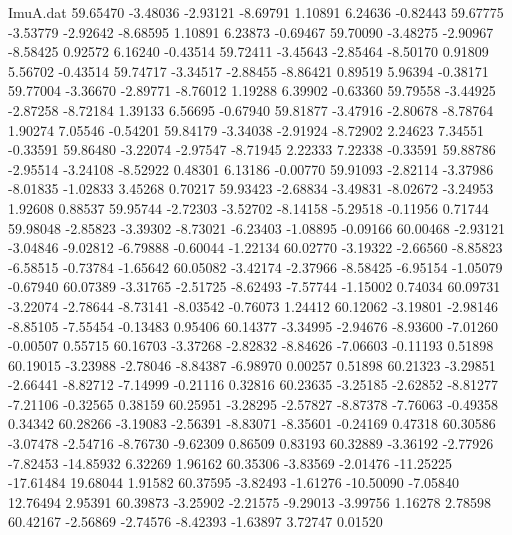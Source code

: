 \begin{filecontents}{ImuA.dat}
  59.65470   -3.48036   -2.93121   -8.69791    1.10891    6.24636   -0.82443
  59.67775   -3.53779   -2.92642   -8.68595    1.10891    6.23873   -0.69467
  59.70090   -3.48275   -2.90967   -8.58425    0.92572    6.16240   -0.43514
  59.72411   -3.45643   -2.85464   -8.50170    0.91809    5.56702   -0.43514
  59.74717   -3.34517   -2.88455   -8.86421    0.89519    5.96394   -0.38171
  59.77004   -3.36670   -2.89771   -8.76012    1.19288    6.39902   -0.63360
  59.79558   -3.44925   -2.87258   -8.72184    1.39133    6.56695   -0.67940
  59.81877   -3.47916   -2.80678   -8.78764    1.90274    7.05546   -0.54201
  59.84179   -3.34038   -2.91924   -8.72902    2.24623    7.34551   -0.33591
  59.86480   -3.22074   -2.97547   -8.71945    2.22333    7.22338   -0.33591
  59.88786   -2.95514   -3.24108   -8.52922    0.48301    6.13186   -0.00770
  59.91093   -2.82114   -3.37986   -8.01835   -1.02833    3.45268    0.70217
  59.93423   -2.68834   -3.49831   -8.02672   -3.24953    1.92608    0.88537
  59.95744   -2.72303   -3.52702   -8.14158   -5.29518   -0.11956    0.71744
  59.98048   -2.85823   -3.39302   -8.73021   -6.23403   -1.08895   -0.09166
  60.00468   -2.93121   -3.04846   -9.02812   -6.79888   -0.60044   -1.22134
  60.02770   -3.19322   -2.66560   -8.85823   -6.58515   -0.73784   -1.65642
  60.05082   -3.42174   -2.37966   -8.58425   -6.95154   -1.05079   -0.67940
  60.07389   -3.31765   -2.51725   -8.62493   -7.57744   -1.15002    0.74034
  60.09731   -3.22074   -2.78644   -8.73141   -8.03542   -0.76073    1.24412
  60.12062   -3.19801   -2.98146   -8.85105   -7.55454   -0.13483    0.95406
  60.14377   -3.34995   -2.94676   -8.93600   -7.01260   -0.00507    0.55715
  60.16703   -3.37268   -2.82832   -8.84626   -7.06603   -0.11193    0.51898
  60.19015   -3.23988   -2.78046   -8.84387   -6.98970    0.00257    0.51898
  60.21323   -3.29851   -2.66441   -8.82712   -7.14999   -0.21116    0.32816
  60.23635   -3.25185   -2.62852   -8.81277   -7.21106   -0.32565    0.38159
  60.25951   -3.28295   -2.57827   -8.87378   -7.76063   -0.49358    0.34342
  60.28266   -3.19083   -2.56391   -8.83071   -8.35601   -0.24169    0.47318
  60.30586   -3.07478   -2.54716   -8.76730   -9.62309    0.86509    0.83193
  60.32889   -3.36192   -2.77926   -7.82453  -14.85932    6.32269    1.96162
  60.35306   -3.83569   -2.01476  -11.25225  -17.61484   19.68044    1.91582
  60.37595   -3.82493   -1.61276  -10.50090   -7.05840   12.76494    2.95391
  60.39873   -3.25902   -2.21575   -9.29013   -3.99756    1.16278    2.78598
  60.42167   -2.56869   -2.74576   -8.42393   -1.63897    3.72747    0.01520

\end{filecontents}
